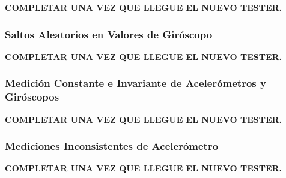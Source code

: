 {\Large \textbf{{\color{red} COMPLETAR UNA VEZ QUE LLEGUE EL NUEVO TESTER.}}}

\subsubsection{Saltos Aleatorios en Valores de Giróscopo}

{\Large \textbf{{\color{red} COMPLETAR UNA VEZ QUE LLEGUE EL NUEVO TESTER.}}}

\subsubsection{Medición Constante e Invariante de Acelerómetros y Giróscopos}

{\Large \textbf{{\color{red} COMPLETAR UNA VEZ QUE LLEGUE EL NUEVO TESTER.}}}

\subsubsection{Mediciones Inconsistentes de Acelerómetro}

{\Large \textbf{{\color{red} COMPLETAR UNA VEZ QUE LLEGUE EL NUEVO TESTER.}}}





